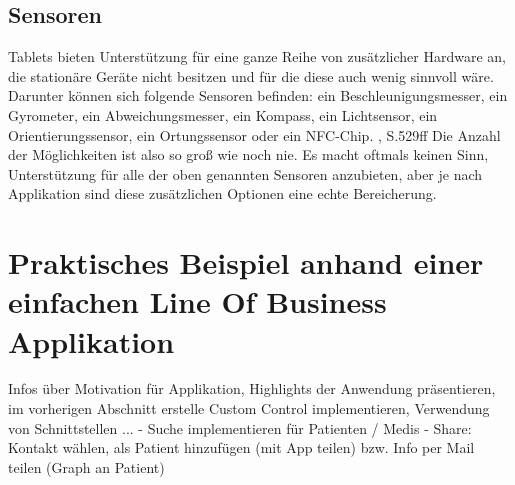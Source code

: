 \documentclass[a4paper,bibtotoc,oneside]{scrbook}
\begin{document}
\section[Sensoren]{Sensoren}
Tablets bieten Unterstützung für eine ganze Reihe von zusätzlicher Hardware an, die stationäre Geräte nicht besitzen und für die diese auch wenig sinnvoll wäre. Darunter können sich folgende Sensoren befinden: ein Beschleunigungsmesser, ein Gyrometer, ein Abweichungsmesser, ein Kompass, ein Lichtsensor, ein Orientierungssensor, ein Ortungssensor oder ein NFC-Chip. \cite{ana12}, S.529ff
\newline
Die Anzahl der Möglichkeiten ist also so groß wie noch nie. Es macht oftmals keinen Sinn, Unterstützung für alle der oben genannten Sensoren anzubieten, aber je nach Applikation sind diese zusätzlichen Optionen eine echte Bereicherung.


\chapter[Praktisches Beispiel anhand einer einfachen Line Of Business Applikation]{Praktisches Beispiel anhand einer einfachen Line Of Business Applikation}\label{practmobile}

Infos über Motivation für Applikation, Highlights der Anwendung präsentieren, im vorherigen Abschnitt erstelle Custom Control implementieren, Verwendung von Schnittstellen ...
\newline
- Suche implementieren für Patienten / Medis
\newline
- Share: Kontakt wählen, als Patient hinzufügen (mit App teilen) bzw. Info per Mail teilen (Graph an Patient)






\end{document}
